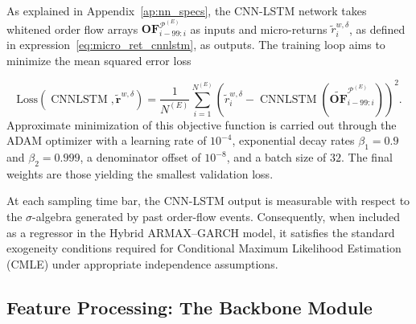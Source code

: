 \documentclass{rQUF2e}
\theoremstyle{plain}
\theoremstyle{definition}
\theoremstyle{remark}
\DeclareMathOperator{\cnnlstm}{CNNLSTM}
\begin{document}
As explained in Appendix~\ref{ap:nn_specs}, the CNN-LSTM network takes whitened order flow arrays $\mathbf{OF}^{\mathcal{P}^{(E)}}_{i - 99:i}$ as inputs and micro-returns $\tilde{r}_i^{w, \delta}$, as defined in expression~\eqref{eq:micro_ret_cnnlstm}, as outputs. The training loop aims to minimize the mean squared error loss

\[
    \text{Loss}(\cnnlstm, \tilde{\mathbf{r}}^{w, \delta})
    =
    \frac{1}{N^{(E)}}
    \sum_{i=1}^{N^{(E)}}
    \left(\tilde{r}_i^{w, \delta} - \cnnlstm\left(\widetilde{\mathbf{OF}}^{\mathcal{P}^{(E)}}_{i - 99:i} \right)\right)^2.
\]
Approximate minimization of this objective function is carried out through the ADAM optimizer \citep{kingma2014adam} with a learning rate of \(10^{-4}\), exponential decay rates \(\beta_1 = 0.9\) and \(\beta_2 = 0.999\), a denominator offset of \(10^{-8}\), and a batch size of \(32\). The final weights are those yielding the smallest validation loss.

At each sampling time bar, the CNN-LSTM output is measurable with respect to the $\sigma$-algebra generated by past order-flow events. Consequently, when included as a regressor in the Hybrid ARMAX–GARCH model, it satisfies the standard exogeneity conditions required for Conditional Maximum Likelihood Estimation (CMLE) under appropriate independence assumptions.

\subsection{Feature Processing: The Backbone Module}
\label{subsec:feature_extraction}
\end{document}

